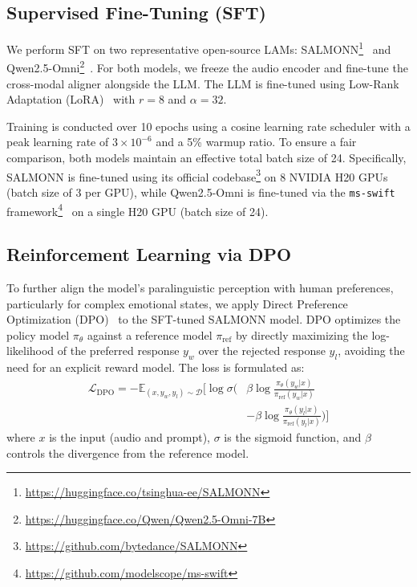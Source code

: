 \documentclass{Interspeech}
\begin{document}
\subsection{Supervised Fine-Tuning (SFT)}
We perform SFT on two representative open-source LAMs: SALMONN\footnote{\url{https://huggingface.co/tsinghua-ee/SALMONN}}~\cite{tangsalmonn} and Qwen2.5-Omni\footnote{\url{https://huggingface.co/Qwen/Qwen2.5-Omni-7B}}~\cite{Qwen2.5-Omni}. For both models, we freeze the audio encoder and fine-tune the cross-modal aligner alongside the LLM. The LLM is fine-tuned using Low-Rank Adaptation (LoRA)~\cite{hu2022lora} with $r=8$ and $\alpha=32$.

Training is conducted over 10 epochs using a cosine learning rate scheduler with a peak learning rate of $3 \times 10^{-6}$ and a 5\% warmup ratio. To ensure a fair comparison, both models maintain an effective total batch size of 24. Specifically, SALMONN is fine-tuned using its official codebase\footnote{\url{https://github.com/bytedance/SALMONN}} on 8 NVIDIA H20 GPUs (batch size of 3 per GPU), while Qwen2.5-Omni is fine-tuned via the \texttt{ms-swift} framework\footnote{\url{https://github.com/modelscope/ms-swift}}~\cite{zhao2024swift} on a single H20 GPU (batch size of 24).

\subsection{Reinforcement Learning via DPO}
To further align the model's paralinguistic perception with human preferences, particularly for complex emotional states, we apply Direct Preference Optimization (DPO)~\cite{dpo} to the SFT-tuned SALMONN model. DPO optimizes the policy model $\pi_\theta$ against a reference model $\pi_{\text{ref}}$ by directly maximizing the log-likelihood of the preferred response $y_w$ over the rejected response $y_l$, avoiding the need for an explicit reward model. The loss is formulated as:
$$ 
\begin{aligned}
\mathcal{L}_{\text{DPO}} = -\mathbb{E}_{(x, y_w, y_l)\sim \mathcal{D}} \bigg[ \log \sigma \bigg( &\beta \log \frac{\pi_\theta(y_w|x)}{\pi_{\text{ref}}(y_w|x)} \\
&- \beta \log \frac{\pi_\theta(y_l|x)}{\pi_{\text{ref}}(y_l|x)} \bigg) \bigg] 
\end{aligned}
$$
where $x$ is the input (audio and prompt), $\sigma$ is the sigmoid function, and $\beta$ controls the divergence from the reference model.
\end{document}
